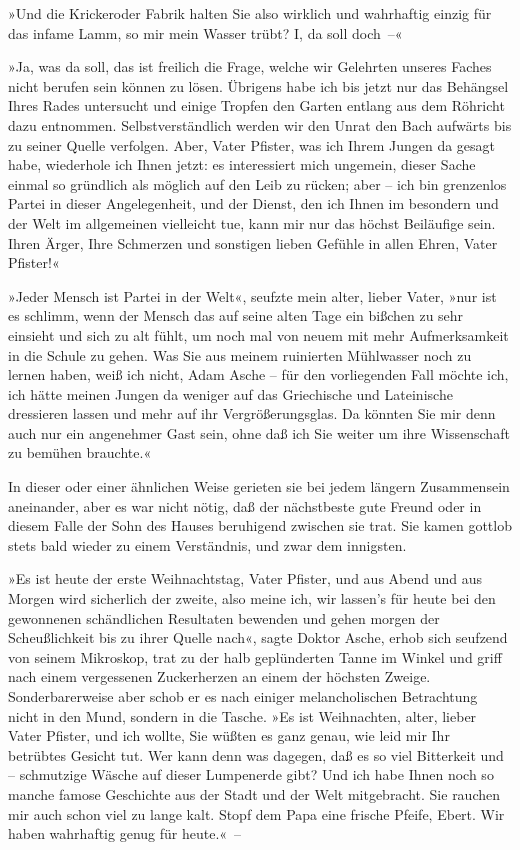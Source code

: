 »Und die Krickeroder Fabrik halten Sie also wirklich und wahrhaftig
einzig für das infame Lamm, so mir mein Wasser trübt? I, da soll
doch~–«

»Ja, was da soll, das ist freilich die Frage, welche wir Gelehrten
unseres Faches nicht berufen sein können zu lösen. Übrigens habe
ich bis jetzt nur das Behängsel Ihres Rades untersucht und einige
Tropfen den Garten entlang aus dem Röhricht dazu entnommen.
Selbstverständlich werden wir den Unrat den Bach aufwärts bis zu
seiner Quelle verfolgen. Aber, Vater Pfister, was ich Ihrem Jungen
da gesagt habe, wiederhole ich Ihnen jetzt: es interessiert mich
ungemein, dieser Sache einmal so gründlich als möglich auf den Leib
zu rücken; aber – ich bin grenzenlos Partei in dieser
Angelegenheit, und der Dienst, den ich Ihnen im besondern und der
Welt im allgemeinen vielleicht tue, kann mir nur das höchst
Beiläufige sein. Ihren Ärger, Ihre Schmerzen und sonstigen lieben
Gefühle in allen Ehren, Vater Pfister!«

»Jeder Mensch ist Partei in der Welt«, seufzte mein alter, lieber
Vater, »nur ist es schlimm, wenn der Mensch das auf seine alten
Tage ein bißchen zu sehr einsieht und sich zu alt fühlt, um noch
mal von neuem mit mehr Aufmerksamkeit in die Schule zu gehen. Was
Sie aus meinem ruinierten Mühlwasser noch zu lernen haben, weiß ich
nicht, Adam Asche – für den vorliegenden Fall möchte ich, ich hätte
meinen Jungen da weniger auf das Griechische und Lateinische
dressieren lassen und mehr auf ihr Vergrößerungsglas. Da könnten
Sie mir denn auch nur ein angenehmer Gast sein, ohne daß ich Sie
weiter um ihre Wissenschaft zu bemühen brauchte.«

In dieser oder einer ähnlichen Weise gerieten sie bei jedem längern
Zusammensein aneinander, aber es war nicht nötig, daß der
nächstbeste gute Freund oder in diesem Falle der Sohn des Hauses
beruhigend zwischen sie trat. Sie kamen gottlob stets bald wieder
zu einem Verständnis, und zwar dem innigsten.

»Es ist heute der erste Weihnachtstag, Vater Pfister, und aus Abend
und aus Morgen wird sicherlich der zweite, also meine ich, wir
lassen's für heute bei den gewonnenen schändlichen Resultaten
bewenden und gehen morgen der Scheußlichkeit bis zu ihrer Quelle
nach«, sagte Doktor Asche, erhob sich seufzend von seinem
Mikroskop, trat zu der halb geplünderten Tanne im Winkel und griff
nach einem vergessenen Zuckerherzen an einem der höchsten Zweige.
Sonderbarerweise aber schob er es nach einiger melancholischen
Betrachtung nicht in den Mund, sondern in die Tasche. »Es ist
Weihnachten, alter, lieber Vater Pfister, und ich wollte, Sie
wüßten es ganz genau, wie leid mir Ihr betrübtes Gesicht tut. Wer
kann denn was dagegen, daß es so viel Bitterkeit und – schmutzige
Wäsche auf dieser Lumpenerde gibt? Und ich habe Ihnen noch so
manche famose Geschichte aus der Stadt und der Welt mitgebracht.
Sie rauchen mir auch schon viel zu lange kalt. Stopf dem Papa eine
frische Pfeife, Ebert. Wir haben wahrhaftig genug für heute.«~–

